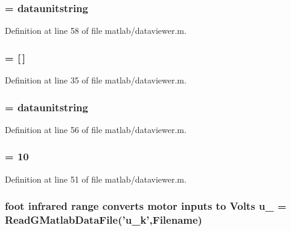 \subsubsection[{theta\_\-as\_\-unitstring}]{ = {\bf dataunitstring}}\label{matlab_2dataviewer_8m_a5a76843a0f52083d02f2a95111cfb628}


Definition at line 58 of file matlab/dataviewer.m.
\subsubsection[{theta\_\-k}]{ = [$\,$]}\label{matlab_2dataviewer_8m_a1b2162a53907dced45d572dbdeb1387a}


Definition at line 35 of file matlab/dataviewer.m.
\subsubsection[{theta\_\-k\_\-unitstring}]{ = {\bf dataunitstring}}\label{matlab_2dataviewer_8m_a000edbe661bff649dfaf24af4bc17ebb}


Definition at line 56 of file matlab/dataviewer.m.
\subsubsection[{twindow}]{ = 10}\label{matlab_2dataviewer_8m_a54d39bd750bf38e91a420568a00e3600}


Definition at line 51 of file matlab/dataviewer.m.
\subsubsection[{u\_\-1}]{\setlength{\rightskip}{0pt plus 5cm}foot infrared range converts motor inputs to Volts {\bf u\_} = ReadGMatlabDataFile('{\bf u\_\-k}',{\bf Filename})}\label{matlab_2dataviewer_8m_ace7b203e012b8b638d98a1d4ef4a10bb}


